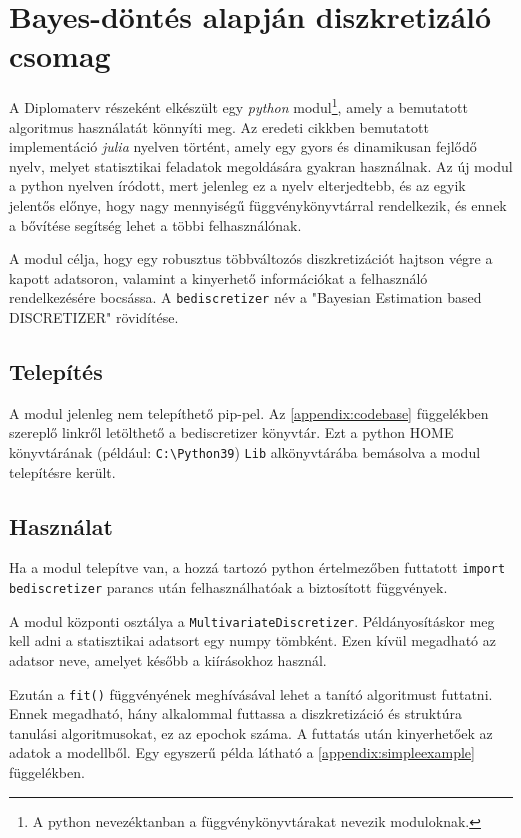 \chapter{Bayes-döntés alapján diszkretizáló csomag}\label{chapter:modul}

\iffalse
A Diplomaterv részeként elkészült egy \textit{python} modul\footnote{A python nevezéktanban a függvénykönyvtárakat nevezik moduloknak.}, amely a bemutatott algoritmus használatát könnyíti meg. Az eredeti cikkben bemutatott implementáció \textit{julia} nyelven történt, amely egy gyors és dinamikusan fejlődő nyelv, melyet statisztikai feladatok megoldására gyakran használnak. Az új modul a python nyelven íródott, mert jelenleg ez a nyelv elterjedtebb, és az egyik jelentős előnye, hogy nagy mennyiségű függvénykönyvtárral rendelkezik, és ennek a bővítése segítség lehet a többi felhasználónak.

A modul célja, hogy egy robusztus többváltozós diszkretizációt hajtson végre a kapott adatsoron, valamint a kinyerhető információkat a felhasználó rendelkezésére bocsássa. A \verb|bediscretizer| név a "Bayesian Estimation based DISCRETIZER" rövidítése.

\section{Telepítés}
A modul jelenleg nem telepíthető pip-pel. Az \ref{appendix:codebase} függelékben szereplő linkről letölthető a bediscretizer könyvtár. Ezt a python HOME könyvtárának (például: \verb|C:\Python39|) \verb|Lib| alkönyvtárába bemásolva a modul telepítésre került.

\section{Használat}
Ha a modul telepítve van, a hozzá tartozó python értelmezőben futtatott \verb|import bediscretizer| parancs után felhasználhatóak a biztosított függvények.

A modul központi osztálya a \verb|MultivariateDiscretizer|. Példányosításkor meg kell adni a statisztikai adatsort egy numpy tömbként. Ezen kívül megadható az adatsor neve, amelyet később a kiírásokhoz használ.

Ezután a \verb|fit()| függvényének meghívásával lehet a tanító algoritmust futtatni. Ennek megadható, hány alkalommal futtassa a diszkretizáció és struktúra tanulási algoritmusokat, ez az epochok száma.
A futtatás után kinyerhetőek az adatok a modellből. Egy egyszerű példa látható a \ref{appendix:simpleexample} függelékben.

